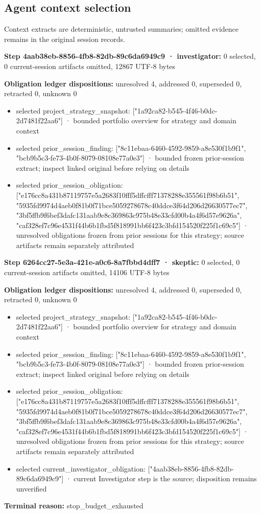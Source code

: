 \documentclass[11pt]{article}
\begin{document}
\subsection{Agent context selection}
Context extracts are deterministic, untrusted summaries; omitted evidence remains in the original session records.\par
\textbf{Step 4aab38eb-8856-4fb8-82db-89c6da6949c9 · investigator:} 0 selected, 0 current-session artifacts omitted, 12867 UTF-8 bytes\par
\textbf{Obligation ledger dispositions:} unresolved 4, addressed 0, superseded 0, retracted 0, unknown 0\par
\begin{itemize}
\item selected project\_strategy\_snapshot: ["1a92ca82-b545-4f46-b0dc-2d7481f22aa6"] · bounded portfolio overview for strategy and domain context
\item selected prior\_session\_finding: ["8c11ebaa-6460-4592-9859-a8e530f1b9f1", "bcb9b5c3-fe73-4b0f-8079-08108e77a0e3"] · bounded frozen prior-session extract; inspect linked original before relying on details
\item selected prior\_session\_obligation: ["e176cc8a431b87119757e5a2683f10fff5dffcfff71378288e355561f98b6b51", "5935fd9974d4aeb0f81b0f71bce5059278678c40ddce3f64d206d26630577ec7", "3bf5ffb9f6bef3dafc131aab9e8c369863c975b48e33cfd00b4a4f6d57e9626a", "caf328ef7c96e4531f44b6b1fbd5f818991bb6f423c3bfd154520f225f1c69c5"] · unresolved obligations frozen from prior sessions for this strategy; source artifacts remain separately attributed
\end{itemize}
\textbf{Step 6264cc27-5e3a-421e-a0c6-8a7fbbd4dff7 · skeptic:} 0 selected, 0 current-session artifacts omitted, 14106 UTF-8 bytes\par
\textbf{Obligation ledger dispositions:} unresolved 4, addressed 0, superseded 0, retracted 0, unknown 0\par
\begin{itemize}
\item selected project\_strategy\_snapshot: ["1a92ca82-b545-4f46-b0dc-2d7481f22aa6"] · bounded portfolio overview for strategy and domain context
\item selected prior\_session\_finding: ["8c11ebaa-6460-4592-9859-a8e530f1b9f1", "bcb9b5c3-fe73-4b0f-8079-08108e77a0e3"] · bounded frozen prior-session extract; inspect linked original before relying on details
\item selected prior\_session\_obligation: ["e176cc8a431b87119757e5a2683f10fff5dffcfff71378288e355561f98b6b51", "5935fd9974d4aeb0f81b0f71bce5059278678c40ddce3f64d206d26630577ec7", "3bf5ffb9f6bef3dafc131aab9e8c369863c975b48e33cfd00b4a4f6d57e9626a", "caf328ef7c96e4531f44b6b1fbd5f818991bb6f423c3bfd154520f225f1c69c5"] · unresolved obligations frozen from prior sessions for this strategy; source artifacts remain separately attributed
\item selected current\_investigator\_obligation: ["4aab38eb-8856-4fb8-82db-89c6da6949c9"] · current Investigator step is the source; disposition remains unverified
\end{itemize}
\textbf{Terminal reason:} stop\_budget\_exhausted\par
\end{document}
